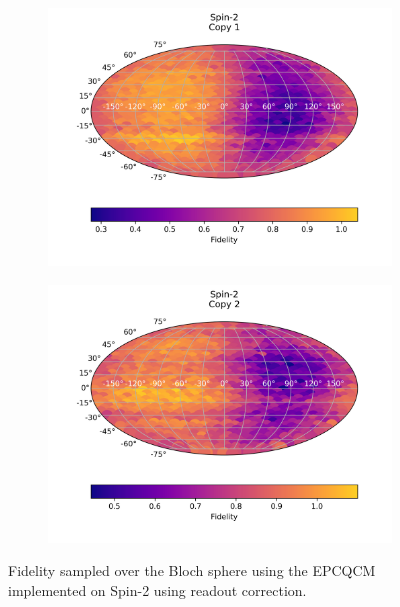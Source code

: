 \begin{figure}[H]
  \centering
  \begin{subfigure}{.5\textwidth}
    \centering
    \includegraphics[width=\textwidth]{Figures/Economical/Spin2/FullSphere/results_spin2_corrected_copy1.png}
    \label{fig:epc_corrected_spin_sphere_1}
  \end{subfigure}%
  \begin{subfigure}{.5\textwidth}
    \centering
    \includegraphics[width=\textwidth]{Figures/Economical/Spin2/FullSphere/results_spin2_corrected_copy2.png}
    \label{fig:epc_corrected_spin_sphere_2}
  \end{subfigure}
  \caption{Fidelity sampled over the Bloch sphere using the EPCQCM implemented on Spin-2 using readout correction.}
  \label{fig:epc_corrected_spin_sphere}
\end{figure}

